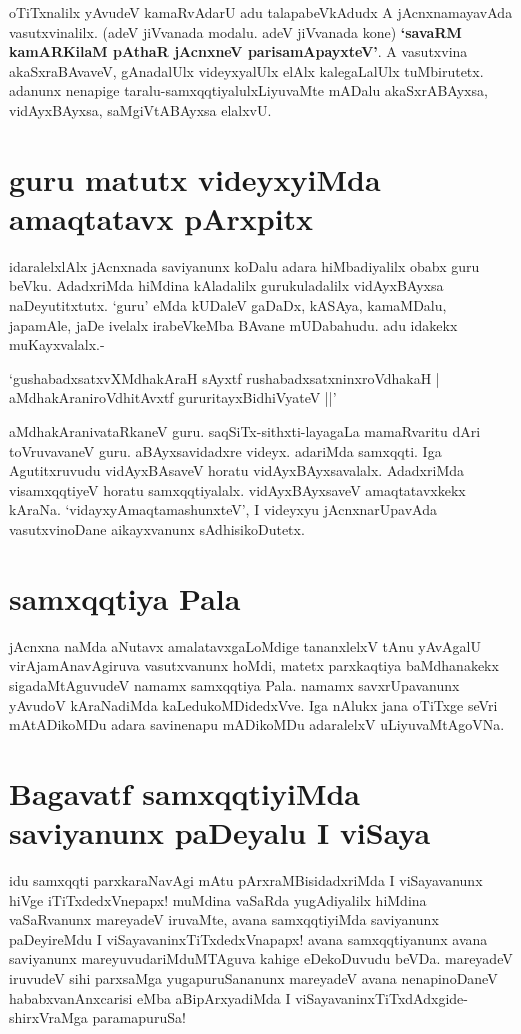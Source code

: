 oTiTxnalilx yAvudeV kamaRvAdarU adu talapabeVkAdudx A jAcnxnamayavAda vasutxvinalilx. (adeV jiVvanada modalu. adeV jiVvanada kone) \textbf{`savaRM kamAR\s KilaM pAthaR\label{98c} jAcnxneV parisamApayxteV'}. A vasutxvina akaSxraBAvaveV, gAnadalUlx videyxyalUlx elAlx kalegaLalUlx tuMbirutetx. adanunx nenapige taralu-samxqqtiyalulxLiyuvaMte mADalu akaSxrABAyxsa, vidAyxBAyxsa, saMgiVtABAyxsa elalxvU.

\section*{guru matutx videyxyiMda amaqtatavx pArxpitx}

idaralelxlAlx jAcnxnada saviyanunx koDalu adara hiMbadiyalilx obabx guru beVku. AdadxriMda hiMdina kAladalilx gurukuladalilx vidAyxBAyxsa naDeyutitxtutx. `guru' eMda kUDaleV gaDaDx, kASAya, kamaMDalu, japamAle, jaDe ivelalx irabeVkeMba BAvane mUDabahudu. adu idakekx muKayxvalalx.-

\begin{shloka}
`gushabadxsatxvXMdhakAraH sAyxtf rushabadxsatxninxroVdhakaH |\label{98a}\\
aMdhakAraniroVdhitAvxtf gururitayxBidhiVyateV ||'
\end{shloka}

aMdhakAranivataRkaneV guru. saqSiTx-sithxti-layagaLa mamaRvaritu dAri toVruvavaneV guru. aBAyxsavidadxre videyx. adariMda samxqqti. Iga Agutitxruvudu vidAyxBAsaveV horatu vidAyxBAyxsavalalx. AdadxriMda visamxqqtiyeV horatu samxqqtiyalalx. vidAyxBAyxsaveV amaqtatavxkekx kAraNa. `vidayxyA\s maqtamashunxteV',\label{99} I videyxyu jAcnxnarUpavAda vasutxvinoDane aikayxvanunx sAdhisikoDutetx.

\section*{samxqqtiya Pala}

jAcnxna naMda aNutavx amalatavxgaLoMdige tananxlelxV tAnu yAvAgalU virAjamAnavAgiruva vasutxvanunx hoMdi, matetx parxkaqtiya baMdhanakekx sigadaMtAguvudeV namamx samxqqtiya Pala. namamx savxrUpavanunx yAvudoV kAraNadiMda kaLedukoMDidedxVve. Iga nAlukx jana oTiTxge seVri mAtADikoMDu adara savinenapu mADikoMDu adaralelxV uLiyuvaMtAgoVNa. 

\section*{Bagavatf samxqqtiyiMda saviyanunx paDeyalu I viSaya}

idu samxqqti parxkaraNavAgi mAtu pArxraMBisidadxriMda I viSayavanunx hiVge iTiTxdedxVnepapx! muMdina vaSaRda yugAdiyalilx hiMdina vaSaRvanunx mareyadeV iruvaMte, avana samxqqtiyiMda saviyanunx paDeyireMdu I viSayavaninxTiTxdedxVnapapx! avana samxqqtiyanunx avana saviyanunx mareyuvudariMduMTAguva kahige eDekoDuvudu beVDa. mareyadeV iruvudeV sihi parxsaMga yugapuruSananunx mareyadeV avana nenapinoDaneV hababxvanAnxcarisi eMba aBipArxyadiMda I viSayavaninxTiTxdAdxgide- shirxVraMga paramapuruSa!

